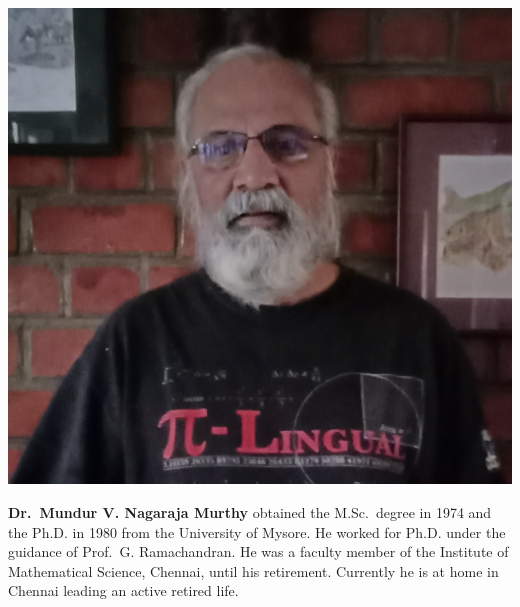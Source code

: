 \centerline{\includegraphics[scale=.1]{authorsphotos/Prof_M_V_N_Murthy.jpg}}
\smallskip

\bigskip 

\noindent
\textbf{Dr.\ Mundur V. Nagaraja Murthy} obtained the M.Sc.\ degree in 1974 and the Ph.D. in 1980 from the University of Mysore. He worked for Ph.D. under the guidance of Prof.\ G. Ramachandran. He was a faculty member of the Institute of Mathematical Science, Chennai, until his retirement. Currently he is at home in Chennai leading an active retired life.
